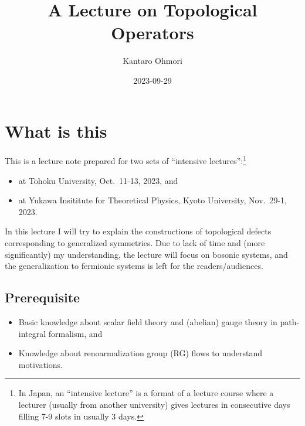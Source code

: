 \documentclass[
  letterpaper,
  DIV=11,
  numbers=noendperiod]{scrreport}
\title{A Lecture on Topological Operators}
\author{Kantaro Ohmori}
\date{2023-09-29}
\providecommand{\tightlist}{%
  \setlength{\itemsep}{0pt}\setlength{\parskip}{0pt}}\usepackage{longtable,booktabs,array}
\renewcommand*\contentsname{Table of contents}
\newcommand\contentsname{Table of contents}
\begin{document}
\maketitle
\ifdefined\Shaded\renewenvironment{Shaded}{\begin{tcolorbox}[boxrule=0pt, sharp corners, breakable, borderline west={3pt}{0pt}{shadecolor}, enhanced, interior hidden, frame hidden]}{\end{tcolorbox}}\fi

\renewcommand*\contentsname{Table of contents}
{
\hypersetup{linkcolor=}
\setcounter{tocdepth}{2}
\tableofcontents
}

\hypertarget{what-is-this}{%
\chapter*{What is this}\label{what-is-this}}


This is a lecture note prepared for two sets of ``intensive
lectures'':\footnote{In Japan, an ``intensive lecture'' is a format of a
  lecture course where a lecturer (usually from another university)
  gives lectures in consecutive days filling 7-9 slots in usually 3
  days.}

\begin{itemize}
\tightlist
\item
  at Tohoku University, Oct.~11-13, 2023, and
\item
  at Yukawa Insititute for Theoretical Physics, Kyoto University,
  Nov.~29-1, 2023.
\end{itemize}

In this lecture I will try to explain the constructions of topological
defects corresponding to generalized symmetries. Due to lack of time and
(more significantly) my understanding, the lecture will focus on bosonic
systems, and the generalization to fermionic systems is left for the
readers/audiences.

\hypertarget{prerequisite}{%
\section*{Prerequisite}\label{prerequisite}}


\begin{itemize}
\tightlist
\item
  Basic knowledge about scalar field theory and (abelian) gauge theory
  in path-integral formalism, and
\item
  Knowledge about renoarmalization group (RG) flows to understand
  motivations.
\end{itemize}
\end{document}
